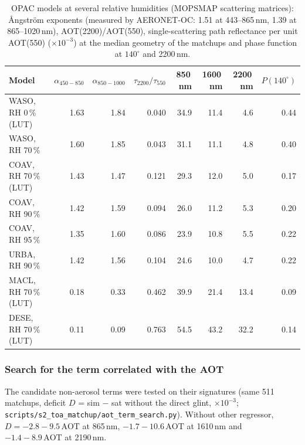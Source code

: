 \documentclass[11pt,a4paper]{article}
\newcommand{\code}[1]{\texttt{#1}}
\begin{document}
\begin{table}[h]
\centering\small
\caption{OPAC models at several relative humidities (MOPSMAP scattering matrices): Ångström exponents (measured by
AERONET-OC: 1.51 at 443--865\,nm, 1.39 at 865--1020\,nm), AOT(2200)/AOT(550), single-scattering path reflectance per
unit AOT(550) ($\times10^{-3}$) at the median geometry of the matchups and phase function at $140^\circ$ and 2200\,nm.}
\label{tab:hygro}
\begin{tabular}{lrrrrrrr}
\toprule
Model & $\alpha_{450-850}$ & $\alpha_{850-1000}$ & $\tau_{2200}/\tau_{550}$ & 850\,nm & 1600\,nm & 2200\,nm & $P(140^\circ)$ \\
\midrule
WASO, RH 0\,\% (LUT)   & 1.63 & 1.84 & 0.040 & 34.9 & 11.4 & 4.6 & 0.44 \\
WASO, RH 70\,\%        & 1.60 & 1.85 & 0.043 & 31.1 & 11.1 & 4.8 & 0.40 \\
COAV, RH 70\,\% (LUT)  & 1.43 & 1.47 & 0.121 & 29.3 & 12.0 & 5.0 & 0.17 \\
COAV, RH 90\,\%        & 1.42 & 1.59 & 0.094 & 26.0 & 11.2 & 5.3 & 0.20 \\
COAV, RH 95\,\%        & 1.35 & 1.60 & 0.086 & 23.9 & 10.8 & 5.5 & 0.22 \\
URBA, RH 90\,\%        & 1.42 & 1.56 & 0.104 & 24.6 & 10.0 & 4.7 & 0.22 \\
MACL, RH 70\,\% (LUT)  & 0.18 & 0.33 & 0.462 & 39.9 & 21.4 & 13.4 & 0.09 \\
DESE, RH 70\,\% (LUT)  & 0.11 & 0.09 & 0.763 & 54.5 & 43.2 & 32.2 & 0.14 \\
\bottomrule
\end{tabular}
\end{table}

\subsubsection{Search for the term correlated with the AOT}
\label{sec:aot_term}
The candidate non-aerosol terms were tested on their signatures (same 511 matchups, deficit $D$ = sim $-$ sat
without the direct glint, $\times10^{-3}$; \code{scripts/s2\_toa\_matchup/aot\_term\_search.py}). Without other
regressor, $D = -2.8 - 9.5\,\mathrm{AOT}$ at 865\,nm, $-1.7 - 10.6\,\mathrm{AOT}$ at 1610\,nm and
$-1.4 - 8.9\,\mathrm{AOT}$ at 2190\,nm.
\end{document}
